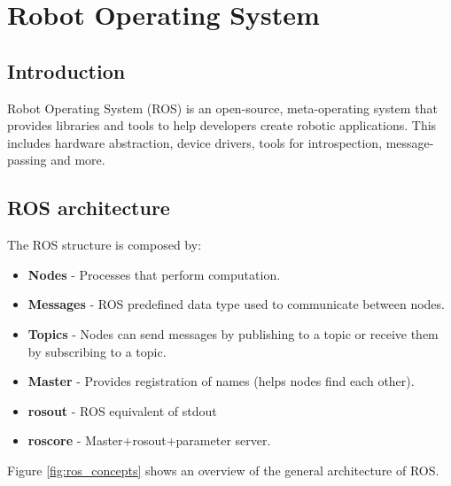 \documentclass[12pt]{article}
\begin{document}
\section{Robot Operating System}

\subsection{Introduction}
Robot Operating System (ROS) is an open-source, meta-operating system that provides libraries and tools to help developers create robotic applications. This includes hardware abstraction, device drivers, tools for introspection, message-passing and more.
\subsection{ROS architecture}
The ROS structure is composed by:
\begin{itemize}
\item \textbf{Nodes} - Processes that perform computation.
\item \textbf{Messages} - ROS predefined data type used to communicate between nodes. 
\item \textbf{Topics} - Nodes can send messages by publishing to a topic or receive them by subscribing to a topic. 
\item \textbf{Master} - Provides registration of names (helps nodes find each other).
\item \textbf{rosout} - ROS equivalent of stdout 
\item \textbf{roscore} - Master+rosout+parameter server. 
\end{itemize}

Figure \ref{fig:ros_concepts} shows an overview of the general architecture of ROS.
\end{document}
